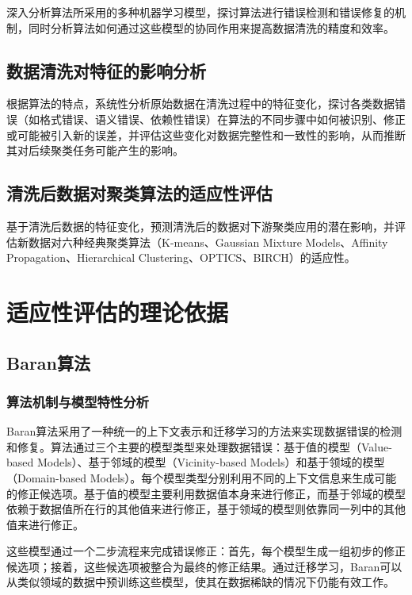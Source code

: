 \documentclass{ctexart} %
\begin{document}
深入分析算法所采用的多种机器学习模型，探讨算法进行错误检测和错误修复的机制，同时分析算法如何通过这些模型的协同作用来提高数据清洗的精度和效率。

\subsection{数据清洗对特征的影响分析}

根据算法的特点，系统性分析原始数据在清洗过程中的特征变化，探讨各类数据错误（如格式错误、语义错误、依赖性错误）在算法的不同步骤中如何被识别、修正或可能被引入新的误差，并评估这些变化对数据完整性和一致性的影响，从而推断其对后续聚类任务可能产生的影响。

\subsection{清洗后数据对聚类算法的适应性评估}

基于清洗后数据的特征变化，预测清洗后的数据对下游聚类应用的潜在影响，并评估新数据对六种经典聚类算法（K-means、Gaussian Mixture Models、Affinity Propagation、Hierarchical Clustering、OPTICS、BIRCH）的适应性。

\section{适应性评估的理论依据}
\subsection{Baran算法}

\subsubsection{算法机制与模型特性分析}

Baran算法采用了一种统一的上下文表示和迁移学习的方法来实现数据错误的检测和修复。算法通过三个主要的模型类型来处理数据错误：基于值的模型（Value-based Models）、基于邻域的模型（Vicinity-based Models）和基于领域的模型（Domain-based Models）。每个模型类型分别利用不同的上下文信息来生成可能的修正候选项。基于值的模型主要利用数据值本身来进行修正，而基于邻域的模型依赖于数据值所在行的其他值来进行修正，基于领域的模型则依靠同一列中的其他值来进行修正。

这些模型通过一个二步流程来完成错误修正：首先，每个模型生成一组初步的修正候选项；接着，这些候选项被整合为最终的修正结果。通过迁移学习，Baran可以从类似领域的数据中预训练这些模型，使其在数据稀缺的情况下仍能有效工作。
\end{document}
